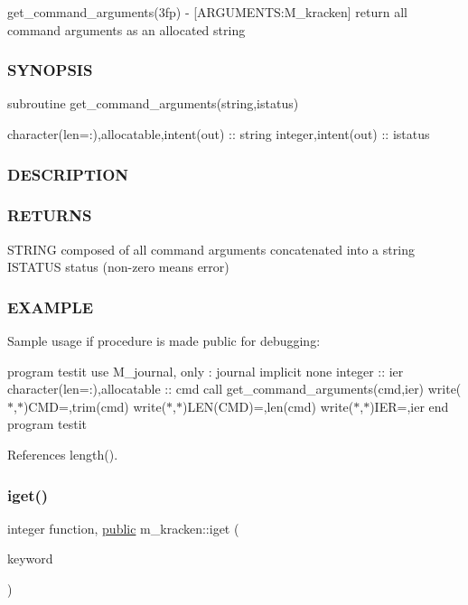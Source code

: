 get\+\_\+command\+\_\+arguments(3fp) -\/ \mbox{[}A\+R\+G\+U\+M\+E\+N\+TS\+:M\+\_\+kracken\mbox{]} return all command arguments as an allocated string 

\subsubsection*{S\+Y\+N\+O\+P\+S\+IS}

subroutine get\+\_\+command\+\_\+arguments(string,istatus)

character(len=\+:),allocatable,intent(out) \+:\+: string integer,intent(out) \+:\+: istatus \subsubsection*{D\+E\+S\+C\+R\+I\+P\+T\+I\+ON}

\subsubsection*{R\+E\+T\+U\+R\+NS}

S\+T\+R\+I\+NG composed of all command arguments concatenated into a string I\+S\+T\+A\+T\+US status (non-\/zero means error)

\subsubsection*{E\+X\+A\+M\+P\+LE}

Sample usage if procedure is made public for debugging\+:

program testit use M\+\_\+journal, only \+: journal implicit none integer \+:\+: ier character(len=\+:),allocatable \+:\+: cmd call get\+\_\+command\+\_\+arguments(cmd,ier) write($\ast$,$\ast$)\textquotesingle{}C\+MD=\textquotesingle{},trim(cmd) write($\ast$,$\ast$)\textquotesingle{}L\+E\+N(\+C\+M\+D)=\textquotesingle{},len(cmd) write($\ast$,$\ast$)\textquotesingle{}I\+ER=\textquotesingle{},ier end program testit 

References length().

\mbox{\label{namespacem__kracken_a420718890eac378e5cd047dd0b477424}} 
\subsubsection{\texorpdfstring{iget()}{iget()}}
{\footnotesize\ttfamily integer function, \hyperlink{M__stopwatch_83_8txt_a2f74811300c361e53b430611a7d1769f}{public} m\+\_\+kracken\+::iget (\begin{DoxyParamCaption}\item[{\hyperlink{option__stopwatch_83_8txt_abd4b21fbbd175834027b5224bfe97e66}{character}(len=$\ast$), intent(\hyperlink{M__journal_83_8txt_afce72651d1eed785a2132bee863b2f38}{in})}]{keyword }\end{DoxyParamCaption})}



